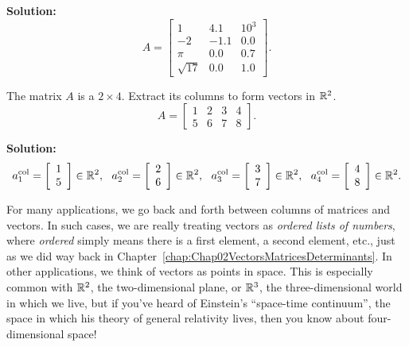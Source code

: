 \textbf{Solution:}
$$
A= \left[\begin{array}{rrc} 1 & 4.1 & 10^3 \\
-2 & -1.1 & 0.0 \\ 
\pi & 0.0 & 0.7\\
\sqrt{17} & 0.0 & 1.0
 \end{array}\right].
 $$
\Qed


\vspace*{0.5cm}
\begin{example}
\label{ex:MAtrixToVectorR4}
The matrix $A$ is a $2 \times 4$. Extract its columns to form vectors in $\mathbb R^2$.
$$
A= \left[\begin{array}{rrrr} 1 & 2 & 3 & 4\\
5 & 6 & 7 & 8
 \end{array}\right].
 $$
\end{example}


\textbf{Solution:}
$$
a_1^{\rm col}=\left[\begin{array}{r} 1 \\5\end{array}\right]\in \mathbb R^2,~~a_2^{\rm col}= \left[\begin{array}{r} 2 \\ 6\end{array}\right]\in \mathbb R^2,~~a_3^{\rm col}=\left[\begin{array}{r} 3 \\ 7 \end{array}\right] \in \mathbb R^2,~~ a_4^{\rm col} = \left[\begin{array}{r} 4 \\ 8 \end{array}\right]\in \mathbb R^2.
$$
\Qed

\vspace*{0.5cm}


For many applications, we go back and forth between columns of matrices and vectors. In such cases, we are really treating vectors as \textit{ordered lists of numbers}, where \textit{ordered} simply means there is a first element, a second element, etc., just as we did way back in Chapter~\ref{chap:Chap02VectorsMatricesDeterminants}. In other applications, we think of vectors as points in space. This is especially common with $\mathbb R^2$, the two-dimensional plane, or $\mathbb R^3$, the three-dimensional world in which we live, but if you've heard of Einstein's ``space-time continuum'', the space in which his theory of general relativity lives, then you know about four-dimensional space! 

